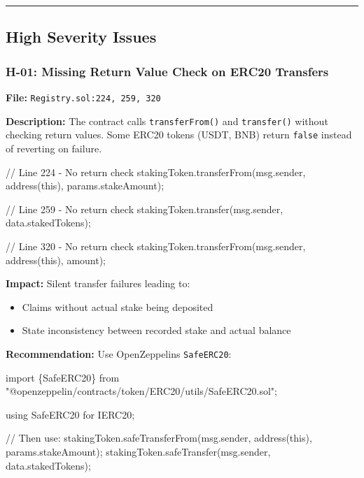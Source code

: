 \documentclass[
]{article}
\newenvironment{Shaded}{}{}
\newcommand{\NormalTok}[1]{#1}
\providecommand{\tightlist}{%
  \setlength{\itemsep}{0pt}\setlength{\parskip}{0pt}}
\begin{document}
\begin{center}\rule{0.5\linewidth}{0.5pt}\end{center}

\subsection{High Severity Issues}\label{high-severity-issues}

\subsubsection{H-01: Missing Return Value Check on ERC20
Transfers}\label{h-01-missing-return-value-check-on-erc20-transfers}

\textbf{File:} \texttt{Registry.sol:224,\ 259,\ 320}

\textbf{Description:} The contract calls \texttt{transferFrom()} and
\texttt{transfer()} without checking return values. Some ERC20 tokens
(USDT, BNB) return \texttt{false} instead of reverting on failure.

\begin{Shaded}
\begin{Highlighting}[]
\NormalTok{// Line 224 {-} No return check}
\NormalTok{stakingToken.transferFrom(msg.sender, address(this), params.stakeAmount);}

\NormalTok{// Line 259 {-} No return check}
\NormalTok{stakingToken.transfer(msg.sender, data.stakedTokens);}

\NormalTok{// Line 320 {-} No return check}
\NormalTok{stakingToken.transferFrom(msg.sender, address(this), amount);}
\end{Highlighting}
\end{Shaded}

\textbf{Impact:} Silent transfer failures leading to:

\begin{itemize}
\tightlist
\item
  Claims without actual stake being deposited
\item
  State inconsistency between recorded stake and actual balance
\end{itemize}

\textbf{Recommendation:} Use OpenZeppelin\textquotesingle s
\texttt{SafeERC20}:

\begin{Shaded}
\begin{Highlighting}[]
\NormalTok{import \{SafeERC20\} from "@openzeppelin/contracts/token/ERC20/utils/SafeERC20.sol";}

\NormalTok{using SafeERC20 for IERC20;}

\NormalTok{// Then use:}
\NormalTok{stakingToken.safeTransferFrom(msg.sender, address(this), params.stakeAmount);}
\NormalTok{stakingToken.safeTransfer(msg.sender, data.stakedTokens);}
\end{Highlighting}
\end{Shaded}
\end{document}
